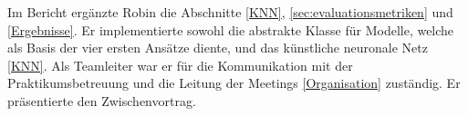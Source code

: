 Im Bericht ergänzte Robin die Abschnitte \ref{KNN}, \ref{sec:evaluationsmetriken} und \ref{Ergebnisse}.
Er implementierte sowohl die abstrakte Klasse für Modelle, welche als Basis der vier ersten Ansätze diente, und das künstliche neuronale Netz \ref{KNN}. Als Teamleiter war er für die Kommunikation mit der Praktikumsbetreuung und die Leitung der Meetings \ref{Organisation} zuständig. Er präsentierte den Zwischenvortrag.

